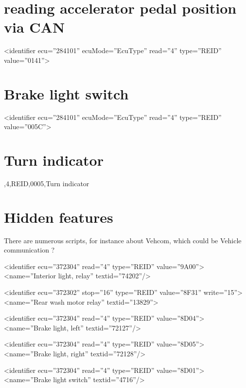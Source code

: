 \documentclass[letterpaper,10pt,english]{sphinxmanual}
\begin{document}
\section{reading accelerator pedal position via CAN}
\label{\detokenize{decoding:reading-accelerator-pedal-position-via-can}}
\sphinxAtStartPar
\textless{}identifier ecu=”284101” ecuMode=”EcuType” read=”4” type=”REID” value=”0141”\textgreater{}


\section{Brake light switch}
\label{\detokenize{decoding:brake-light-switch}}
\sphinxAtStartPar
\textless{}identifier ecu=”284101” ecuMode=”EcuType” read=”4” type=”REID” value=”005C”\textgreater{}


\section{Turn indicator}
\label{\detokenize{decoding:turn-indicator}}
,4,REID,0005,Turn indicator


\section{Hidden features}
\label{\detokenize{decoding:hidden-features}}
\sphinxAtStartPar
There are numerous scripts, for instance about Vehcom, which could be Vehicle communication ?

\sphinxAtStartPar
\textless{}identifier ecu=”372304” read=”4” type=”REID” value=”9A00”\textgreater{}
\textless{}name=”Interior light, relay” textid=”74202”/\textgreater{}

\sphinxAtStartPar
{}

\sphinxAtStartPar
\textless{}identifier ecu=”372302” stop=”16” type=”REID” value=”8F31” write=”15”\textgreater{}
\textless{}name=”Rear wash motor relay” textid=”13829”\textgreater{}

\sphinxAtStartPar
\textless{}identifier ecu=”372304” read=”4” type=”REID” value=”8D04”\textgreater{}
\textless{}name=”Brake light, left” textid=”72127”/\textgreater{}

\sphinxAtStartPar
\textless{}identifier ecu=”372304” read=”4” type=”REID” value=”8D05”\textgreater{}
\textless{}name=”Brake light, right” textid=”72128”/\textgreater{}

\sphinxAtStartPar
\textless{}identifier ecu=”372304” read=”4” type=”REID” value=”8D01”\textgreater{}
\textless{}name=”Brake light switch” textid=”4716”/\textgreater{}
\end{document}
